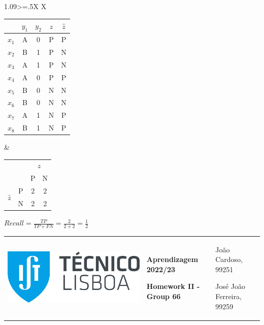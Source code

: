 \documentclass[11pt,a4paper]{article}
\begin{document}
\begin{flushleft}
  \vspace{5mm}
  \begin{tabularx}{1.09\textwidth}{>{\hsize=.5\hsize}X X}
    \begin{tabular}{c|cc|c|c}
            & $y_1$ & $y_2$ & $z$ & $\hat{z}$ \\ \hline
      $x_1$ & A     & 0     & P   & P         \\
      $x_2$ & B     & 1     & P   & N         \\
      $x_3$ & A     & 1     & P   & N         \\
      $x_4$ & A     & 0     & P   & P         \\ \hline
      $x_5$ & B     & 0     & N   & N         \\
      $x_6$ & B     & 0     & N   & N         \\
      $x_7$ & A     & 1     & N   & P         \\
      $x_8$ & B     & 1     & N   & P        
    \end{tabular}
    &
    \vspace{10mm}\begin{tabular}{llcc}
                                                                 &                        & \multicolumn{2}{c}{$z$} \\
                                                                 & \multicolumn{1}{l|}{}  & \multicolumn{1}{c|}{P}   & N   \\ \cline{2-4} 
    \multicolumn{1}{c}{\multirow{2}{*}{$\hat{z}$}} & \multicolumn{1}{c|}{P} & \multicolumn{1}{c|}{2}   & 2   \\ \cline{2-4} 
    \multicolumn{1}{c}{}                                         & \multicolumn{1}{c|}{N} & \multicolumn{1}{c|}{2}   & 2
    \end{tabular} \par
    \vspace{5mm} $ Recall = \frac{TP}{TP + FN} = \frac{2}{2 + 2} = \frac{1}{2} $
  \end{tabularx}
\end{flushleft}
\normalsize

\pagebreak
\color{darkgray}
\hspace{-8.25mm}
\begin{tabularx}{1.09\textwidth} {>{\raggedright\arraybackslash}X >{\centering\arraybackslash}X >{\raggedleft\arraybackslash}X}
  \includegraphics[scale=0.2]{tecnico.pdf} &
  \textbf{Aprendizagem 2022/23} \par \textbf{Homework II - Group 66} &
  João Cardoso, 99251 \par José João Ferreira, 99259
\end{tabularx}
\color{black}
\end{document}
